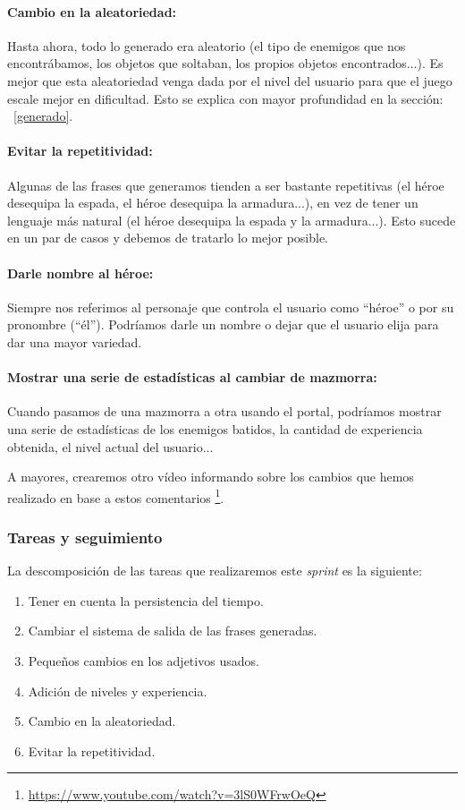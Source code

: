 \paragraph{Cambio en la aleatoriedad:} Hasta ahora, todo lo generado era aleatorio (el tipo de enemigos que nos encontrábamos, los objetos que soltaban, los propios objetos encontrados...). Es mejor que esta aleatoriedad venga dada por el nivel del usuario para que el juego escale mejor en dificultad. Esto se explica con mayor profundidad en la sección: ~\ref{generado}.

\paragraph{Evitar la repetitividad:} Algunas de las frases que generamos tienden a ser bastante repetitivas (el héroe desequipa la espada, el héroe desequipa la armadura...), en vez de tener un lenguaje más natural (el héroe desequipa la espada y la armadura...). Esto sucede en un par de casos y debemos de tratarlo lo mejor posible.

\paragraph{Darle nombre al héroe:} Siempre nos referimos al personaje que controla el usuario como ``héroe'' o por su pronombre (``él''). Podríamos darle un nombre o dejar que el usuario elija para dar una mayor variedad.

\paragraph{Mostrar una serie de estadísticas al cambiar de mazmorra:} Cuando pasamos de una mazmorra a otra usando el portal, podríamos mostrar una serie de estadísticas de los enemigos batidos, la cantidad de experiencia obtenida, el nivel actual del usuario...

A mayores, crearemos otro vídeo informando sobre los cambios que hemos realizado en base a estos comentarios \footnote{\url{https://www.youtube.com/watch?v=3lS0WFrwOeQ}}.

\subsubsection{Tareas y seguimiento}

La descomposición de las tareas que realizaremos este \textit{sprint} es la siguiente:

\begin{enumerate}[label=\bfseries WBS 8.\arabic*]
  \item Tener en cuenta la persistencia del tiempo.
  \item Cambiar el sistema de salida de las frases generadas.
  \item Pequeños cambios en los adjetivos usados.
  \item Adición de niveles y experiencia.
  \item Cambio en la aleatoriedad.
  \item Evitar la repetitividad.
\end{enumerate}

